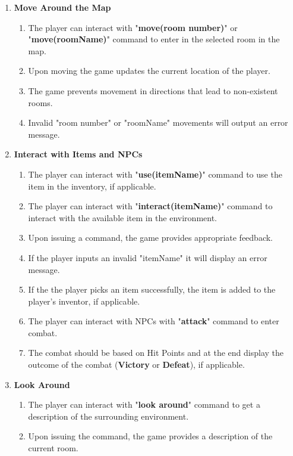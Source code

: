 \documentclass{article}
\begin{document}
\begin{enumerate}
    \item \textbf{Move Around the Map}
\begin{enumerate}
    \item The player can interact with "\textbf{move(room number)}" or  "\textbf{move(roomName)}" command to enter in the selected room in the map.
    \item Upon moving the game updates the current location of the player.
    \item The game prevents movement in directions that lead to non-existent rooms. 
    \item Invalid "room number" or "roomName" movements will output an error message.
\end{enumerate}

    \item \textbf{Interact with Items and NPCs}
\begin{enumerate}
    \item The player can interact with "\textbf{use(itemName)}" command to use the item in the inventory, if applicable.
    \item The player can interact with "\textbf{interact(itemName)}" command to interact with the available item in the environment.
    \item Upon issuing a command, the game provides appropriate feedback.
    \item If the player inputs an invalid "itemName" it will display an error message.
    \item If the the player picks an item successfully, the item is added to the player's inventor, if applicable. 
    \item The player can interact with NPCs with "\textbf{attack}" command to enter combat.
    \item The combat should be based on Hit Points and at the end display the outcome of the combat (\textbf{Victory} or \textbf{Defeat}), if applicable.
\end{enumerate}

    \item \textbf{Look Around}
\begin{enumerate}
    \item The player can interact with "\textbf{look around}" command to get a description of the surrounding environment.
    \item Upon issuing the command, the game provides a description of the current room.

\end{enumerate}


\end{enumerate}
\end{document}
